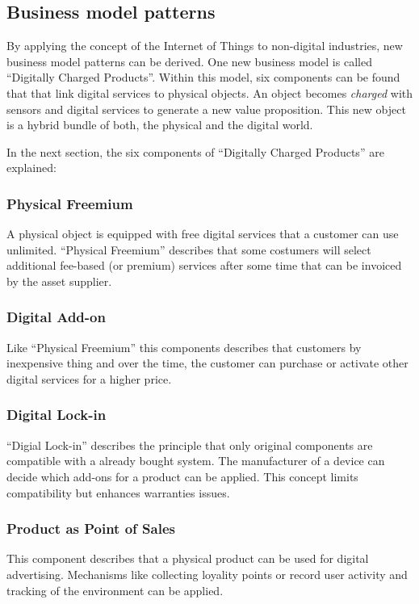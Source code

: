 \subsection{Business model patterns}
By applying the concept of the Internet of Things to non-digital industries, new business model patterns can be derived. One new business model is called ``Digitally Charged Products''. Within this model, six components can be found that that link digital services to physical objects. An object becomes \textit{charged} with sensors and digital services to generate a new value proposition. This new object is a hybrid bundle of both, the physical and the digital world.

In the next section, the six components of ``Digitally Charged Products'' are explained:

\subsubsection{Physical Freemium}
A physical object is equipped with free digital services that a customer can use unlimited. ``Physical Freemium'' describes that some costumers will select additional fee-based (or premium) services after some time that can be invoiced by the asset supplier.

\subsubsection{Digital Add-on}
Like ``Physical Freemium'' this components describes that customers by inexpensive thing and over the time, the customer can purchase or activate other digital services for a higher price.

\subsubsection{Digital Lock-in}
``Digial Lock-in'' describes the principle that only original components are compatible with a already bought system. The manufacturer of a device can decide which add-ons for a product can be applied. This concept limits compatibility but enhances warranties issues.

\subsubsection{Product as Point of Sales}
This component describes that a physical product can be used for digital advertising. Mechanisms like collecting loyality points or record user activity and tracking of the environment can be applied.

